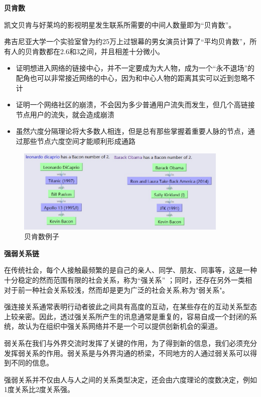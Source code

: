 \begin{frame}
	\textbf{贝肯数}
	
	凯文贝肯与好莱坞的影视明星发生联系所需要的中间人数量即为“贝肯数”。
	
	弗吉尼亚大学一个实验室曾为约25万上过银幕的男女演员计算了“平均贝肯数”，所有人的贝肯数都在2.6和3之间，并且相差十分微小。
	\begin{itemize}
		\item 证明想进入网络的链接中心，并不一定要成为大人物，成为一个“永不退场”的配角也可以非常接近网络的中心，因为和中心人物的距离其实可以近到忽略不计
		\item 证明一个网络社区的崩溃，不会因为多少普通用户流失而发生，但几个高链接节点用户的流失，就会造成崩溃
		\item 虽然六度分隔理论将大多数人相连，但是总有那些掌握着重要人脉的节点，通过那些节点六度空间才能顺利形成通路
	\end{itemize}

\end{frame}

\begin{frame}

	\begin{figure}[htbp]
		\centering
		\includegraphics[width=0.9\textwidth]{pic/t3.jpg}
		\caption{贝肯数例子}
	\end{figure}

\end{frame}

\begin{frame}
	\textbf{强弱关系链}
	
	在传统社会，每个人接触最频繁的是自己的亲人、同学、朋友、同事等，这是一种十分稳定的然而范围有限的社会关系，称为“强关系” ；同时，还存在另外一类相对于前一种社会关系较浅，然而却是更为广泛的社会关系,称为"弱关系"。
	
	强连接关系通常表明行动者彼此之间具有高度的互动，在某些存在的互动关系型态上较亲密。因此，透过强关系所产生的讯息通常是重复的，容易自成一个封闭的系统，故认为在组织中强关系网络并不是一个可以提供创新机会的渠道。
	
	弱关系在我们与外界交流时发挥了关键的作用，为了得到新的信息，我们必须充分发挥弱关系的作用。弱关系是与外界沟通的桥梁，不同地方的人通过弱关系可以得到不同的信息。
	
	强弱关系并不仅由人与人之间的关系类型决定，还会由六度理论的度数决定，例如1度关系比2度关系强。

\end{frame}

